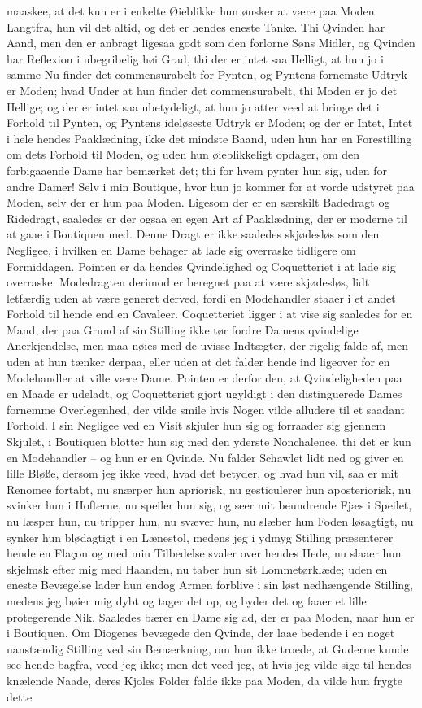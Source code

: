 \documentclass[12pt,a4paper]{article}
\begin{document}
maaskee, at det kun er i enkelte Øieblikke hun ønsker at være paa Moden. Langtfra, hun vil det altid, og det er hendes eneste Tanke. Thi Qvinden har Aand, men den er anbragt ligesaa godt som den forlorne Søns Midler, og Qvinden har Reflexion i ubegribelig høi Grad, thi der er intet saa Helligt, at hun jo i samme Nu finder det commensurabelt for Pynten, og Pyntens fornemste Udtryk er Moden; hvad Under at hun finder det commensurabelt, thi Moden er jo det Hellige; og der er intet saa ubetydeligt, at hun jo atter veed at bringe det i Forhold til Pynten, og Pyntens ideløseste Udtryk er Moden; og der er Intet, Intet i hele hendes Paaklædning, ikke det mindste Baand, uden hun har en Forestilling om dets Forhold til Moden, og uden hun øieblikkeligt opdager, om den forbigaaende Dame har bemærket det; thi for hvem pynter hun sig, uden for andre Damer! Selv i min Boutique, hvor hun jo kommer for at vorde udstyret paa Moden, selv der er hun paa Moden. Ligesom der er en særskilt Badedragt og Ridedragt, saaledes er der ogsaa en egen Art af Paaklædning, der er moderne til at gaae i Boutiquen med. Denne Dragt er ikke saaledes skjødesløs som den Negligee, i hvilken en Dame behager at lade sig overraske tidligere om Formiddagen. Pointen er da hendes Qvindelighed og Coquetteriet i at lade sig overraske. Modedragten derimod er beregnet paa at være skjødesløs, lidt letfærdig uden at være generet derved, fordi en Modehandler staaer i et andet Forhold til hende end en Cavaleer. Coquetteriet ligger i at vise sig saaledes for en Mand, der paa Grund af sin Stilling ikke tør fordre Damens qvindelige Anerkjendelse, men maa nøies med de uvisse Indtægter, der rigelig falde af, men uden at hun tænker derpaa, eller uden at det falder hende ind ligeover for en Modehandler at ville være Dame. Pointen er derfor den, at Qvindeligheden paa en Maade er udeladt, og Coquetteriet gjort ugyldigt i den distinguerede Dames fornemme Overlegenhed, der vilde smile hvis Nogen vilde alludere til et saadant Forhold. I sin Negligee ved en Visit skjuler hun sig og forraader sig gjennem Skjulet, i Boutiquen blotter hun sig med den yderste Nonchalence, thi det er kun en Modehandler – og hun er en Qvinde. Nu falder Schawlet lidt ned og giver en lille Bløße, dersom jeg ikke veed, hvad det betyder, og hvad hun vil, saa er mit Renomee fortabt, nu snærper hun apriorisk, nu gesticulerer hun aposteriorisk, nu svinker hun i Hofterne, nu speiler hun sig, og seer mit beundrende Fjæs i Speilet, nu læsper hun, nu tripper hun, nu svæver hun, nu slæber hun Foden løsagtigt, nu synker hun blødagtigt i en Lænestol, medens jeg i ydmyg Stilling præsenterer hende en Flaçon og med min Tilbedelse svaler over hendes Hede, nu slaaer hun skjelmsk efter mig med Haanden, nu taber hun sit Lommetørklæde; uden en eneste Bevægelse lader hun endog Armen forblive i sin løst nedhængende Stilling, medens jeg bøier mig dybt og tager det op, og byder det og faaer et lille protegerende Nik. Saaledes bærer en Dame sig ad, der er paa Moden, naar hun er i Boutiquen. Om Diogenes bevægede den Qvinde, der laae bedende i en noget uanstændig Stilling ved sin Bemærkning, om hun ikke troede, at Guderne kunde see hende bagfra, veed jeg ikke; men det veed jeg, at hvis jeg vilde sige til hendes knælende Naade, deres Kjoles Folder falde ikke paa Moden, da vilde hun frygte dette 
\end{document}
